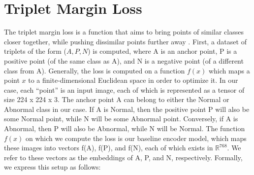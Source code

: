 \documentclass[remotesensing,article,submit,moreauthors]{Definitions/mdpi}
\begin{document}




\appendixstart
\appendix
\section{Triplet Margin Loss}
\label{app:marginloss}
The triplet margin loss is a function that aims to bring points of similar classes closer together, while pushing dissimilar points further away \cite{Schroff_2015_CVPR}. First, a dataset of triplets of the form ($A, P, N$) is computed, where A is an anchor point, P is a positive point (of the same class as A), and N is a negative point (of a different class from A). Generally, the loss is computed on a function $f(x)$ which maps a point $x$ to a finite-dimensional Euclidean space in order to optimize it. In our case, each “point” is an input image, each of which is represented as a tensor of size 224 x 224 x 3. The anchor point A can belong to either the Normal or Abnormal class in our case. If A is Normal, then the positive point P will also be some Normal point, while N will be some Abnormal point. Conversely, if A is Abnormal, then P will also be Abnormal, while N will be Normal. The function $f(x)$ on which we compute the loss is our baseline encoder model, which maps these images into vectors f(A), f(P), and f(N), each of which exists in $\mathbb{R}^{768}$. We refer to these vectors as the embeddings of A, P, and N, respectively. Formally, we express this setup as follows:
\end{document}
